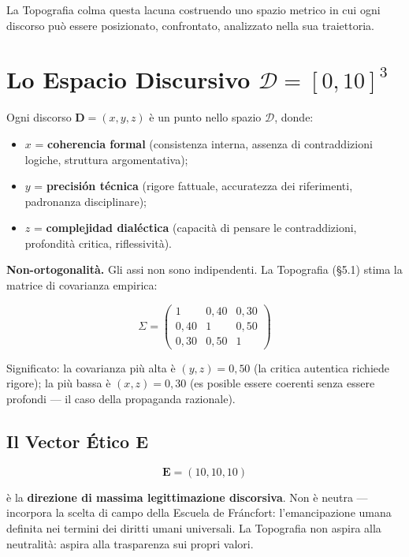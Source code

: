 La Topografia colma questa lacuna costruendo uno spazio metrico in cui
ogni discorso può essere posizionato, confrontato, analizzato nella sua
traiettoria.



\section{\texorpdfstring{Lo Espacio Discursivo
\(\mathcal{D} = [0, 10]^3\)}{Lo Espacio Discursivo \textbackslash mathcal\{D\} = {[}0, 10{]}\^{}3}}\label{lo-spazio-discorsivo-mathcald-0-103}

Ogni discorso \(\mathbf{D} = (x, y, z)\) è un punto nello spazio
\(\mathcal{D}\), donde:

\begin{itemize}
\tightlist
\item
  \(x\) = \textbf{coherencia formal} (consistenza interna, assenza di
  contraddizioni logiche, struttura argomentativa);
\item
  \(y\) = \textbf{precisión técnica} (rigore fattuale, accuratezza dei
  riferimenti, padronanza disciplinare);
\item
  \(z\) = \textbf{complejidad dialéctica} (capacità di pensare le
  contraddizioni, profondità critica, riflessività).
\end{itemize}

\Hypoth{} \textbf{Non-ortogonalità.} Gli assi non sono indipendenti. La
Topografia (\S{}5.1) stima la matrice di covarianza empirica:

\[
\Sigma = \begin{pmatrix} 1 & 0{,}40 & 0{,}30 \\ 0{,}40 & 1 & 0{,}50 \\ 0{,}30 & 0{,}50 & 1 \end{pmatrix}
\]

\Proved{} Significato: la covarianza più alta è \((y, z) = 0{,}50\) (la
critica autentica richiede rigore); la più bassa è \((x, z) = 0{,}30\)
(es posible essere coerenti senza essere profondi --- il caso della
propaganda razionale).

\subsection{\texorpdfstring{Il Vector Ético
\(\mathbf{E}\)}{Il Vector Ético \textbackslash mathbf\{E\}}}\label{il-vettore-etico-mathbfe}

\[
\mathbf{E} = (10, 10, 10)
\]

è la \textbf{direzione di massima legittimazione discorsiva}. Non è
neutra --- incorpora la scelta di campo della Escuela de Fráncfort:
l'emancipazione umana definita nei termini dei diritti umani universali.
La Topografia non aspira alla neutralità: aspira alla trasparenza sui
propri valori.



